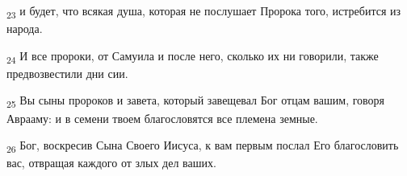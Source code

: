 \begin{tcolorbox}
\textsubscript{23} и будет, что всякая душа, которая не послушает Пророка того, истребится из народа.
\end{tcolorbox}
\begin{tcolorbox}
\textsubscript{24} И все пророки, от Самуила и после него, сколько их ни говорили, также предвозвестили дни сии.
\end{tcolorbox}
\begin{tcolorbox}
\textsubscript{25} Вы сыны пророков и завета, который завещевал Бог отцам вашим, говоря Аврааму: и в семени твоем благословятся все племена земные.
\end{tcolorbox}
\begin{tcolorbox}
\textsubscript{26} Бог, воскресив Сына Своего Иисуса, к вам первым послал Его благословить вас, отвращая каждого от злых дел ваших.
\end{tcolorbox}
